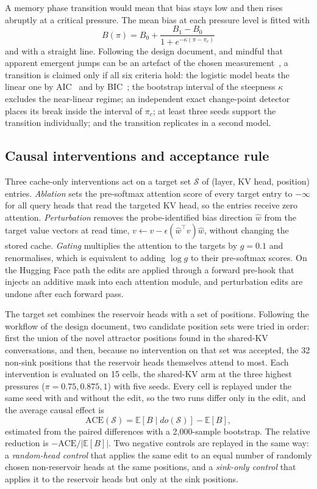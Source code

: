 A memory phase transition would mean that bias stays low and then rises abruptly at a critical pressure. The mean bias at each pressure level is fitted with
\begin{equation}
B(\pi) = B_0 + \frac{B_1 - B_0}{1 + e^{-\kappa(\pi - \pi_c)}}
\end{equation}
and with a straight line. Following the design document, and mindful that apparent emergent jumps can be an artefact of the chosen measurement~\cite{schaeffer2023mirage}, a transition is claimed only if all six criteria hold: the logistic model beats the linear one by AIC~\cite{akaike1974aic} and by BIC~\cite{schwarz1978bic}; the bootstrap interval of the steepness $\kappa$ excludes the near-linear regime; an independent exact change-point detector places its break inside the interval of $\pi_c$; at least three seeds support the transition individually; and the transition replicates in a second model.

\subsection{Causal interventions and acceptance rule}
Three cache-only interventions act on a target set $\mathcal{S}$ of (layer, KV head, position) entries. \emph{Ablation} sets the pre-softmax attention score of every target entry to $-\infty$ for all query heads that read the targeted KV head, so the entries receive zero attention. \emph{Perturbation} removes the probe-identified bias direction $\hat w$ from the target value vectors at read time, $v \leftarrow v - \epsilon(\hat w^\top v)\hat w$, without changing the stored cache. \emph{Gating} multiplies the attention to the targets by $g = 0.1$ and renormalises, which is equivalent to adding $\log g$ to their pre-softmax scores. On the Hugging Face path the edits are applied through a forward pre-hook that injects an additive mask into each attention module, and perturbation edits are undone after each forward pass.

The target set combines the reservoir heads with a set of positions. Following the workflow of the design document, two candidate position sets were tried in order: first the union of the novel attractor positions found in the shared-KV conversations, and then, because no intervention on that set was accepted, the 32 non-sink positions that the reservoir heads themselves attend to most. Each intervention is evaluated on 15 cells, the shared-KV arm at the three highest pressures ($\pi = 0.75, 0.875, 1$) with five seeds. Every cell is replayed under the same seed with and without the edit, so the two runs differ only in the edit, and the average causal effect is
\begin{equation}
\mathrm{ACE}(\mathcal{S}) = \mathbb{E}\left[B \mid do(\mathcal{S})\right] - \mathbb{E}[B],
\end{equation}
estimated from the paired differences with a 2,000-sample bootstrap. The relative reduction is $-\mathrm{ACE}/|\mathbb{E}[B]|$. Two negative controls are replayed in the same way: a \emph{random-head control} that applies the same edit to an equal number of randomly chosen non-reservoir heads at the same positions, and a \emph{sink-only control} that applies it to the reservoir heads but only at the sink positions.

